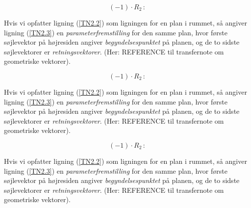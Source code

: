 \begin{info}

\begin{equation}(-1)\cdot R_2\,: \nonumber 
\end{equation}

Hvis vi opfatter ligning (\ref{TN2.2}) som ligningen for en plan i rummet, så angiver ligning (\ref{TN2.3}) en \textit{parameterfremstilling} for den samme plan, hvor første søjlevektor på højresiden angiver \textit{begyndelsespunktet} på planen, og de to sidste søjlevektorer er \textit{retningsvektorer}. (Her: REFERENCE til transfernote om geometriske vektorer).
\end{info}



\begin{think}

\begin{equation}
(-1)\cdot R_2\,: \nonumber 
\end{equation}

Hvis vi opfatter ligning (\ref{TN2.2}) som ligningen for en plan i rummet, så angiver ligning (\ref{TN2.3}) en \textit{parameterfremstilling} for den samme plan, hvor første søjlevektor på højresiden angiver \textit{begyndelsespunktet} på planen, og de to sidste søjlevektorer er \textit{retningsvektorer}. (Her: REFERENCE til transfernote om geometriske vektorer).

\begin{equation}(-1)\cdot R_2\,: \nonumber \end{equation}

\end{think}



\begin{aha}
Hvis vi opfatter ligning (\ref{TN2.2}) som ligningen for en plan i rummet, så angiver ligning (\ref{TN2.3}) en \textit{parameterfremstilling} for den samme plan, hvor første søjlevektor på højresiden angiver \textit{begyndelsespunktet} på planen, og de to sidste søjlevektorer er \textit{retningsvektorer}. (Her: REFERENCE til transfernote om geometriske vektorer).
\end{aha}



